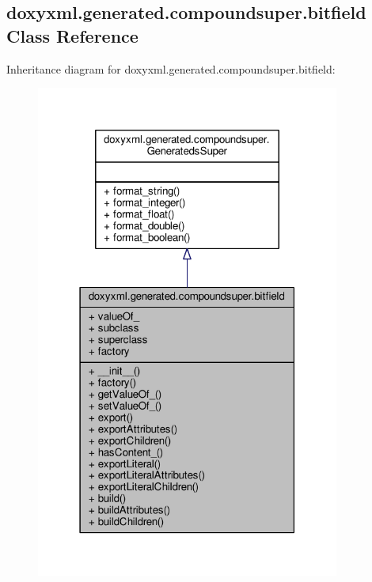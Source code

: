 \subsection{doxyxml.\+generated.\+compoundsuper.\+bitfield Class Reference}
\label{classdoxyxml_1_1generated_1_1compoundsuper_1_1bitfield}


Inheritance diagram for doxyxml.\+generated.\+compoundsuper.\+bitfield\+:
\nopagebreak
\begin{figure}[H]
\begin{center}
\leavevmode
\includegraphics[width=283pt]{d7/d96/classdoxyxml_1_1generated_1_1compoundsuper_1_1bitfield__inherit__graph}
\end{center}
\end{figure}


